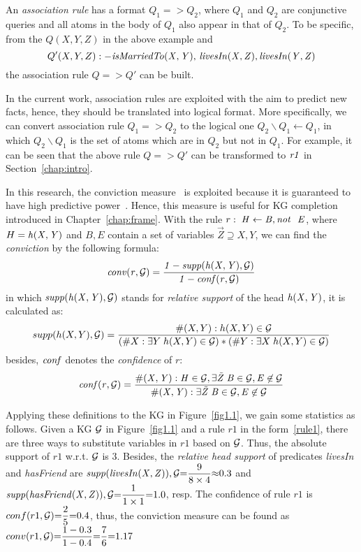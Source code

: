 An \emph{association rule} has a format $Q_1 => Q_2$, where $Q_1$ and $Q_2$ are conjunctive queries and all atoms in the body of $Q_1$ also appear in that of $Q_2$. To be specific, from the $Q(X,Y,Z)$ in the above example and
\begin{equation}Q'(X,Y,Z):-\mathit{isMarriedTo(X,Y),\,livesIn(X,Z),\,} \mathit{livesIn(Y,Z)}
\end{equation} the association rule $Q => Q'$ can be built.

In the current work, association rules are exploited with the aim to predict new facts, hence, they should be translated into logical format. More specifically, we can convert association rule $Q_1=>Q_2$ to the logical one $Q_2\backslash Q_1 \leftarrow Q_1$, in which $Q_2 \backslash Q_1$ is the set of atoms which are in $Q_2$ but not in $Q_1$. For example, it can be seen that the above rule $Q=>Q'$ can be transformed to $\mathit{r1}$ in Section~\ref{chap:intro}.

In this research, the conviction measure~\cite{ref48} is exploited because it is guaranteed to have high predictive power~\cite{ref46}. Hence, this measure is useful for KG completion introduced in Chapter~\ref{chap:frame}. With the rule $r:\;\mathit{H\leftarrow B, \mathit{not}~ \ E}$, where $H=\mathit{h(X,Y)}$ and $B,E$ contain a set of variables $\vec{Z}\supseteq X,Y$, we can find the \emph{conviction} by the following formula:
\vspace{-.26cm}
\begin{equation}
\mathit{conv(r, \mathcal{G})= \dfrac{1 - supp(h(X,Y), \mathcal{G})}{1 - conf(r, \mathcal{G})}}
\end{equation}
in which $\mathit{supp(h(X,Y),\mathcal{G})}$ stands for \textit{relative support} of the head $\mathit{h(X,Y)}$, it is calculated as:
\vspace{-.28cm}
\begin{equation}
supp(h(X,Y),\mathcal{G})=\dfrac{\#(X,Y):h(X,Y)\in \mathcal{G}}{(\#X:\exists Y\;h(X,Y)\in \mathcal{G})*(\#Y:\exists X\;h(X,Y)\in \mathcal{G})}
\end{equation}
besides, $\mathit{conf}$ denotes the \textit{confidence} of $r$:
\begin{equation}
\mathit{conf(r,\mathcal{G})=\dfrac{\#(X,Y): H \in \mathcal{G}, \exists \vec{Z}\;B\in \mathcal{G},E \not \in \mathcal{G}}{\#(X,Y):\exists \vec{Z}\; B\in \mathcal{G}, E \not \in \mathcal{G}}}
\end{equation}
\vspace{-.3cm}

\begin{example}
Applying these definitions to the KG in Figure~\ref{fig1.1}, we gain some statistics as follows. Given a KG $\mathcal{G}$ in Figure~\ref{fig1.1} and a rule $r1$ in the form~\ref{rule1}, there are three ways to substitute variables in $r1$ based on $\mathcal{G}$. Thus, the absolute support of $r1$ w.r.t. $\mathcal{G}$ is $3$. Besides, the \textit{relative head support} of predicates \textit{livesIn} and \textit{hasFriend} are $\mathit{supp(livesIn(X,Z)), \mathcal{G}}{=}\dfrac{9}{8 \times 4}{\approx} 0.3$ and  $\mathit{supp(hasFriend(X,Z)), \mathcal{G}}{=}\dfrac{1}{1 \times 1}{=} 1.0$, resp. The confidence of rule $r1$ is $conf(r1, \mathcal{G}) {=} \dfrac{2}{5} {=} 0.4$, thus, the conviction measure can be found as $conv(r1, \mathcal{G}) {=} \dfrac{1-0.3}{1 - 0.4} {=} \dfrac{7}{6} {=} 1.17$
\end{example}